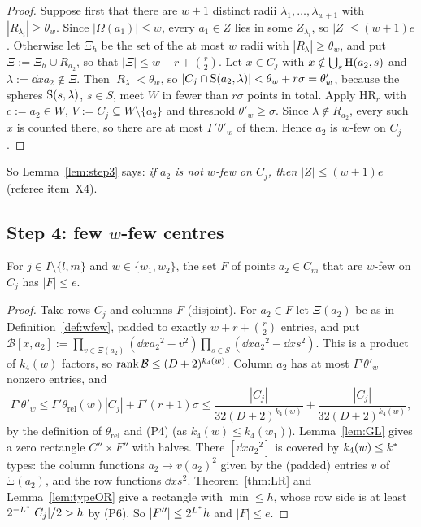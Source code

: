 \begin{proof}
Suppose first that there are $w+1$ distinct radii $\lambda_1,\dots,\lambda_{w+1}$ with $|R_{\lambda_i}|\ge\theta_w$. Since
$|\Omega(a_1)|\le w$, every $a_1\in Z$ lies in some $Z_{\lambda_i}$, so $|Z|\le(w+1)e$. Otherwise let $\Xi_h$ be the set of
the at most $w$ radii with $|R_\lambda|\ge\theta_w$, and put $\Xi:=\Xi_h\cup R_{a_2}$, so that $|\Xi|\le w+r+\binom r2$. Let
$x\in C_j$ with $x\notin\bigcup_s\mathrm{H}(a_2,s)$ and $\lambda:=\dd x{a_2}\notin\Xi$. Then $|R_\lambda|<\theta_w$, so
$|C_j\cap\mathrm{S}(a_2,\lambda)|<\theta_w+r\sigma=\theta'_w$, because the spheres $\mathrm{S}(s,\lambda)$, $s\in S$, meet $W$ in fewer than
$r\sigma$ points in total. Apply HR$_r$ with $c:=a_2\in W$, $V:=C_j\subseteq W\setminus\{a_2\}$ and threshold
$\theta'_w\ge\sigma$. Since $\lambda\notin R_{a_2}$, every such $x$ is counted there, so there are at most $\Gamma'\theta'_w$ of
them. Hence $a_2$ is $w$-few on $C_j$.
\end{proof}

So Lemma~\ref{lem:step3} says: \emph{if $a_2$ is not $w$-few on $C_j$, then $|Z|\le(w+1)e$} (referee item~X4).

\subsection{Step 4: few $w$-few centres}

\begin{lemma}[Step 4]\label{lem:step4}
For $j\in I\setminus\{l,m\}$ and $w\in\{w_1,w_2\}$, the set $F$ of points $a_2\in C_m$ that are $w$-few on $C_j$ has $|F|\le e$.
\end{lemma}
\begin{proof}
Take rows $C_j$ and columns $F$ (disjoint). For $a_2\in F$ let $\Xi(a_2)$ be as in Definition~\ref{def:wfew}, padded to
exactly $w+r+\binom r2$ entries, and put
$\mathcal B[x,a_2]:=\prod_{v\in\Xi(a_2)}(\dd x{a_2}^2-v^2)\prod_{s\in S}(\dd x{a_2}^2-\dd xs^2)$. This is a product of
$k_4(w)$ factors, so $\operatorname{rank}\mathcal B\le(D+2)^{k_4(w)}$. Column $a_2$ has at most $\Gamma'\theta'_w$ nonzero entries, and
\[
\Gamma'\theta'_w\le\Gamma'\theta_{\mathrm{rel}}(w)|C_j|+\Gamma'(r+1)\sigma\le\frac{|C_j|}{32(D+2)^{k_4(w)}}+\frac{|C_j|}{32(D+2)^{k_4(w)}},
\]
by the definition of $\theta_{\mathrm{rel}}$ and (P4) (as $k_4(w)\le k_4(w_1)$). Lemma~\ref{lem:GL} gives a zero rectangle
$C''\times F''$ with halves. There $[\dd x{a_2}^2]$ is covered by $k_4(w)\le k^{\ast}$ types: the column functions $a_2\mapsto v(a_2)^2$
given by the (padded) entries $v$ of $\Xi(a_2)$, and the row functions $\dd xs^2$. Theorem~\ref{thm:LR} and Lemma~\ref{lem:typeOR} give a rectangle with
$\min\le h$, whose row side is at least $2^{-L^{\ast}}|C_j|/2>h$ by (P6). So $|F''|\le2^{L^{\ast}}h$ and $|F|\le e$.
\end{proof}

